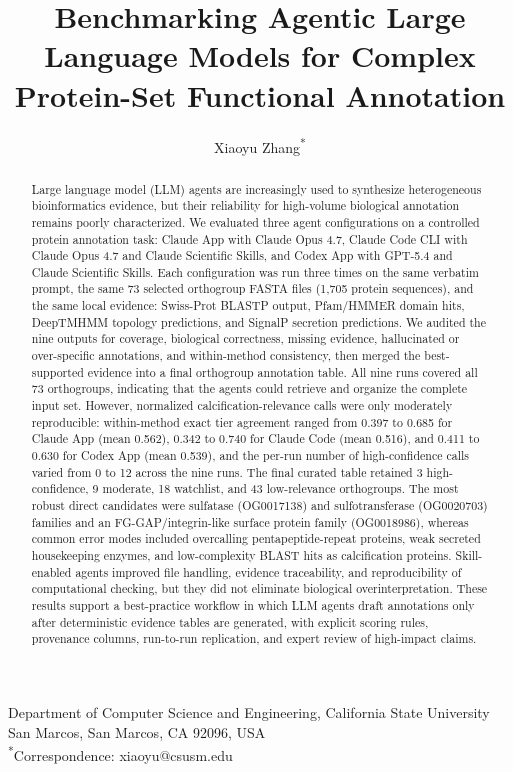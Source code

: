 \documentclass[11pt]{article}
\title{Benchmarking Agentic Large Language Models for Complex Protein-Set Functional Annotation}
\author{Xiaoyu Zhang\textsuperscript{*}}
\date{}
\begin{document}
\maketitle

\begin{center}
Department of Computer Science and Engineering, California State University San Marcos, San Marcos, CA 92096, USA\\
\textsuperscript{*}Correspondence: xiaoyu@csusm.edu
\end{center}

\begin{abstract}
Large language model (LLM) agents are increasingly used to synthesize heterogeneous bioinformatics evidence, but their reliability for high-volume biological annotation remains poorly characterized. We evaluated three agent configurations on a controlled protein annotation task: Claude App with Claude Opus 4.7, Claude Code CLI with Claude Opus 4.7 and Claude Scientific Skills, and Codex App with GPT-5.4 and Claude Scientific Skills. Each configuration was run three times on the same verbatim prompt, the same 73 selected orthogroup FASTA files (1{,}705 protein sequences), and the same local evidence: Swiss-Prot BLASTP output, Pfam/HMMER domain hits, DeepTMHMM topology predictions, and SignalP secretion predictions. We audited the nine outputs for coverage, biological correctness, missing evidence, hallucinated or over-specific annotations, and within-method consistency, then merged the best-supported evidence into a final orthogroup annotation table. All nine runs covered all 73 orthogroups, indicating that the agents could retrieve and organize the complete input set. However, normalized calcification-relevance calls were only moderately reproducible: within-method exact tier agreement ranged from 0.397 to 0.685 for Claude App (mean 0.562), 0.342 to 0.740 for Claude Code (mean 0.516), and 0.411 to 0.630 for Codex App (mean 0.539), and the per-run number of high-confidence calls varied from 0 to 12 across the nine runs. The final curated table retained 3 high-confidence, 9 moderate, 18 watchlist, and 43 low-relevance orthogroups. The most robust direct candidates were sulfatase (OG0017138) and sulfotransferase (OG0020703) families and an FG-GAP/integrin-like surface protein family (OG0018986), whereas common error modes included overcalling pentapeptide-repeat proteins, weak secreted housekeeping enzymes, and low-complexity BLAST hits as calcification proteins. Skill-enabled agents improved file handling, evidence traceability, and reproducibility of computational checking, but they did not eliminate biological overinterpretation. These results support a best-practice workflow in which LLM agents draft annotations only after deterministic evidence tables are generated, with explicit scoring rules, provenance columns, run-to-run replication, and expert review of high-impact claims.
\end{abstract}
\end{document}
